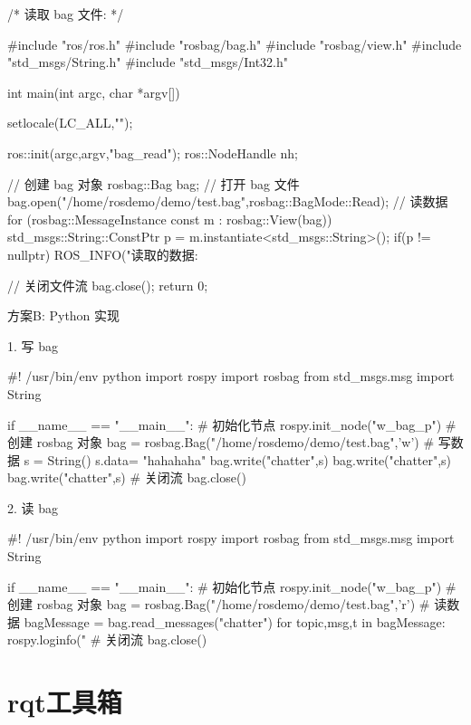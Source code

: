 \documentclass[openany, fontset=windowsold]{ctexbook}
\theoremstyle{kaiti}
\theoremstyle{normal}
\begin{document}
\begin{cpp}
  /*  
      读取 bag 文件: 
  */

  #include "ros/ros.h"
  #include "rosbag/bag.h"
  #include "rosbag/view.h"
  #include "std_msgs/String.h"
  #include "std_msgs/Int32.h"

  int main(int argc, char *argv[])
  {
      setlocale(LC_ALL,"");

      ros::init(argc,argv,"bag_read");
      ros::NodeHandle nh;

      // 创建 bag 对象
      rosbag::Bag bag;
      // 打开 bag 文件
      bag.open("/home/rosdemo/demo/test.bag",rosbag::BagMode::Read);
      // 读数据
      for (rosbag::MessageInstance const m : rosbag::View(bag))
      {
          std_msgs::String::ConstPtr p = m.instantiate<std_msgs::String>();
          if(p != nullptr){
              ROS_INFO("读取的数据:%
          }
      }

      // 关闭文件流
      bag.close();
      return 0;
  }
\end{cpp}

方案B: Python 实现

1. 写 bag

\begin{python}
  #! /usr/bin/env python
  import rospy
  import rosbag
  from std_msgs.msg import String

  if __name__ == "__main__":
      # 初始化节点 
      rospy.init_node("w_bag_p")
      # 创建 rosbag 对象
      bag = rosbag.Bag("/home/rosdemo/demo/test.bag",'w')
      # 写数据
      s = String()
      s.data= "hahahaha"
      bag.write("chatter",s)
      bag.write("chatter",s)
      bag.write("chatter",s)
      # 关闭流
      bag.close()
\end{python}

2. 读 bag

\begin{python}
  #! /usr/bin/env python
  import rospy
  import rosbag
  from std_msgs.msg import String

  if __name__ == "__main__":
      # 初始化节点 
      rospy.init_node("w_bag_p")
      # 创建 rosbag 对象
      bag = rosbag.Bag("/home/rosdemo/demo/test.bag",'r')
      # 读数据
      bagMessage = bag.read_messages("chatter")
      for topic,msg,t in bagMessage:
          rospy.loginfo("%
      # 关闭流
      bag.close()
\end{python}

\section{rqt工具箱}
\end{document}
